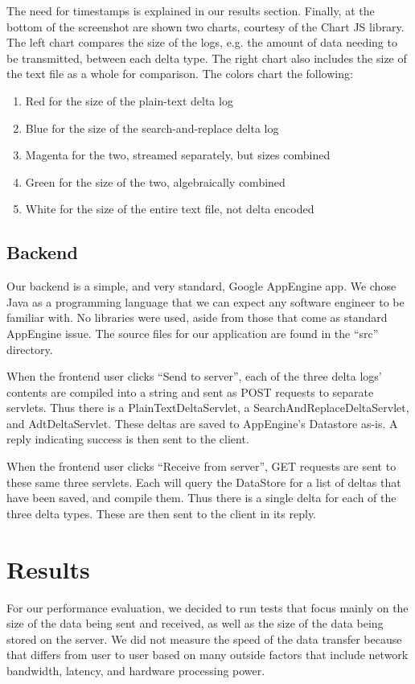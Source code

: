 \documentclass[12pt,a4paper]{article}
\begin{document}
		The need for timestamps is explained in our results section. Finally, at the bottom of the screenshot are shown two charts, courtesy of the Chart JS library. The left chart compares the size of the logs, e.g. the amount of data needing to be transmitted, between each delta type. The right chart also includes the size of the text file as a whole for comparison. The colors chart the following:
		
		\begin{enumerate}
			\item Red for the size of the plain-text delta log
			\item Blue for the size of the search-and-replace delta log
			\item Magenta for the two, streamed separately, but sizes combined
			\item Green for the size of the two, algebraically combined
			\item White for the size of the entire text file, not delta encoded 
		\end{enumerate}
		
		\subsection{Backend}
		
		Our backend is a simple, and very standard, Google AppEngine app. We chose Java as a programming language that we can expect any software engineer to be familiar with. No libraries were used, aside from those that come as standard AppEngine issue. The source files for our application are found in the “src” directory.
		
		When the frontend user clicks “Send to server”, each of the three delta logs’ contents are compiled into a string and sent as POST requests to separate servlets. Thus there is a PlainTextDeltaServlet, a SearchAndReplaceDeltaServlet, and AdtDeltaServlet. These deltas are saved to AppEngine’s Datastore as-is. A reply indicating success is then sent to the client.
		
		When the frontend user clicks “Receive from server”, GET requests are sent to these same three servlets. Each will query the DataStore for a list of deltas that have been saved, and compile them. Thus there is a single delta for each of the three delta types. These are then sent to the client in its reply.
		
		
	\section{Results}
		For our performance evaluation, we decided to run tests that focus mainly on the size of the data being sent and received, as well as the size of the data being stored on the server. We did not measure the speed of the data transfer because that differs from user to user based on many outside factors that include network bandwidth, latency, and hardware processing power.
			
\end{document}
